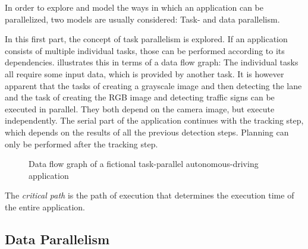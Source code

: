 \documentclass[BCOR20mm,DIV14,10pt,headinclude,footexclude,bibtotoc,liststotoc]{article}
\begin{document}
In order to explore and model the ways in which an application can be
parallelized, two models are usually considered: Task- and data parallelism.

In this first part, the concept of task parallelism is explored. If an
application consists of multiple individual tasks, those can be performed
according to its dependencies.  illustrates this in terms
of a data flow graph: The individual tasks all require some input data, which is
provided by another task. It is however apparent that the tasks of creating a
grayscale image and then detecting the lane and the task of creating the RGB
image and detecting traffic signs can be executed in parallel. They both depend
on the camera image, but execute independently. The serial part of the
application continues with the tracking step, which depends on the results of
all the previous detection steps. Planning can only be performed after the
tracking step.

\begin{figure}
	\centering
	\caption{Data flow graph of a fictional task-parallel autonomous-driving application}
	\label{fig:task_graph}
\end{figure}

The \emph{critical path} is the path of execution that determines the execution
time of the entire application. 


\subsection{Data Parallelism}
\end{document}
